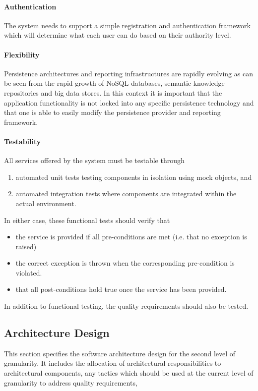 \paragraph*{Authentication}
The system needs to support a simple registration and authentication framework
which will determine what each user can do based on their authority level.

\paragraph*{Flexibility}
Persistence architectures and reporting infrastructures are rapidly evolving as can
be seen from the rapid growth of NoSQL databases, semantic knowledge repositories and big data
stores. In this context it is important that the application functionality is not locked into any
specific persistence technology and that one is able to easily modify the persistence provider and
reporting framework.

\paragraph*{Testability}
All services offered by the system must be testable through
\begin{enumerate}
	\item automated unit tests testing components in isolation using mock objects, and
	\item automated integration tests where components are integrated within the actual environment.
\end{enumerate}

In either case, these functional tests should verify that
\begin{itemize}
	\item the service is provided if all pre-conditions are met (i.e. that no exception is raised)
	\item the correct exception is thrown when the corresponding pre-condition
	is violated.
	\item that all post-conditions hold true once the service has been provided.
\end{itemize}

In addition to functional testing, the quality requirements should also be tested.

\subsection{Architecture Design}
This section specifies the software architecture design for the second level of 
granularity. It includes the allocation of architectural responsibilities to 
architectural components, any tactics which should be used at the current level
of granularity to address quality requirements,

